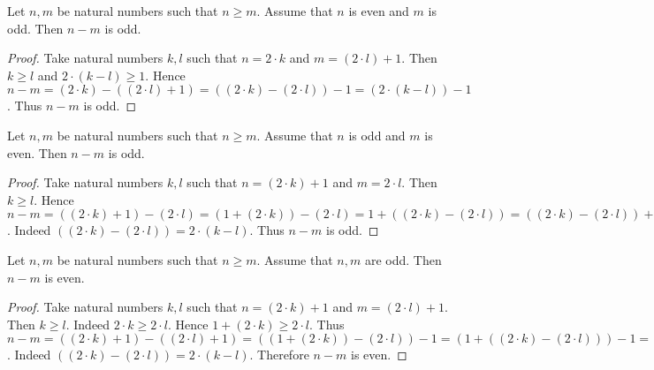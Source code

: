 \documentclass[10pt]{article}
\begin{document}
  \begin{forthel}
    \begin{proposition}[id=ARITHMETIC_15_0125412036589958,printid]
      Let $n, m$ be natural numbers such that $n \geq m$.
      Assume that $n$ is even and $m$ is odd.
      Then $n - m$ is odd.
    \end{proposition}
    \begin{proof}
      Take natural numbers $k, l$ such that $n = 2 \cdot k$ and $m = (2 \cdot l) + 1$.
      Then $k \geq l$ and $2 \cdot (k - l) \geq 1$.
      Hence $n - m
        = (2 \cdot k) - ((2 \cdot l) + 1)
        = ((2 \cdot k) - (2 \cdot l)) - 1
        = (2 \cdot (k - l)) - 1$.
      Thus $n - m$ is odd.
    \end{proof}
  \end{forthel}

  \begin{forthel}
    \begin{corollary}[id=ARITHMETIC_15_1021458745896523,printid]
      Let $n, m$ be natural numbers such that $n \geq m$.
      Assume that $n$ is odd and $m$ is even.
      Then $n - m$ is odd.
    \end{corollary}
    \begin{proof}
      Take natural numbers $k, l$ such that $n = (2 \cdot k) + 1$ and $m = 2 \cdot l$.
      Then $k \geq l$.
      Hence $n - m
        = ((2 \cdot k) + 1) - (2 \cdot l)
        = (1 + (2 \cdot k)) - (2 \cdot l)
        = 1 + ((2 \cdot k) - (2 \cdot l))
        = ((2 \cdot k) - (2 \cdot l)) + 1
        = (2 \cdot (k - l)) + 1$.
      Indeed $((2 \cdot k) - (2 \cdot l)) = 2 \cdot (k - l)$. %
      Thus $n - m$ is odd.
    \end{proof}
  \end{forthel}

  \begin{forthel}
    \begin{proposition}[id=ARITHMETIC_15_0125478854587412,printid]
      Let $n, m$ be natural numbers such that $n \geq m$.
      Assume that $n, m$ are odd.
      Then $n - m$ is even.
    \end{proposition}
    \begin{proof}
      Take natural numbers $k, l$ such that $n = (2 \cdot k) + 1$ and $m = (2 \cdot l) + 1$.
      Then $k \geq l$.
      Indeed $2 \cdot k \geq 2 \cdot l$.
      Hence $1 + (2 \cdot k) \geq 2 \cdot l$.
      Thus $n - m
        = ((2 \cdot k) + 1) - ((2 \cdot l) + 1)
        = ((1 + (2 \cdot k)) - (2 \cdot l)) - 1
        = (1 + ((2 \cdot k) - (2 \cdot l))) - 1
        = (1 + (2 \cdot (k - l))) - 1
        = ((2 \cdot (k - l)) + 1) - 1
        = 2 \cdot (k - l)$.
      Indeed $((2 \cdot k) - (2 \cdot l)) = 2 \cdot (k - l)$. %
      Therefore $n - m$ is even.
    \end{proof}
  \end{forthel}
\end{document}
